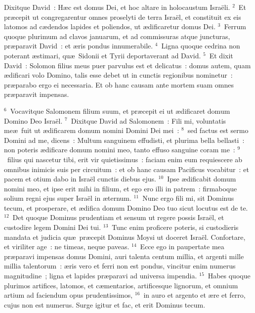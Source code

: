 \bchapter
\lettrine[lines=3,image=true,loversize=0.05,lraise=-0.03]{D}{}ixitque David~: H\ae c est domus Dei, et hoc altare in holocaustum Isra\"eli.
${}^{2}$~Et pr\ae cepit ut congregarentur omnes proselyti de terra Isra\"el, et constituit ex eis latomos ad c\ae dendos lapides et poliendos, ut \ae dificaretur domus Dei.
${}^{3}$~Ferrum quoque plurimum ad clavos januarum, et ad commissuras atque juncturas, pr\ae paravit David~: et \ae ris pondus innumerabile.
${}^{4}$~Ligna quoque cedrina non poterant \ae stimari, qu\ae\ Sidonii et Tyrii deportaverant ad David.
${}^{5}$~Et dixit David~: Solomon filius meus puer parvulus est et delicatus~: domus autem, quam \ae dificari volo Domino, talis esse debet ut in cunctis regionibus nominetur~: pr\ae parabo ergo ei necessaria. Et ob hanc causam ante mortem suam omnes pr\ae paravit impensas.


${}^{6}$~Vocavitque Salomonem filium suum, et pr\ae cepit ei ut \ae dificaret domum Domino Deo Isra\"el.
${}^{7}$~Dixitque David ad Salomonem~: Fili mi, voluntatis me\ae\ fuit ut \ae dificarem domum nomini Domini Dei mei~:
${}^{8}$~sed factus est sermo Domini ad me, dicens~: Multum sanguinem effudisti, et plurima bella bellasti~: non poteris \ae dificare domum nomini meo, tanto effuso sanguine coram me~:
${}^{9}$~filius qui nascetur tibi, erit vir quietissimus~: faciam enim eum requiescere ab omnibus inimicis suis per circuitum~: et ob hanc causam Pacificus vocabitur~: et pacem et otium dabo in Isra\"el cunctis diebus ejus.
${}^{10}$~Ipse \ae dificabit domum nomini meo, et ipse erit mihi in filium, et ego ero illi in patrem~: firmaboque solium regni ejus super Isra\"el in \ae ternum.
${}^{11}$~Nunc ergo fili mi, sit Dominus tecum, et prosperare, et \ae difica domum Domino Deo tuo sicut locutus est de te.
${}^{12}$~Det quoque Dominus prudentiam et sensum ut regere possis Isra\"el, et custodire legem Domini Dei tui.
${}^{13}$~Tunc enim proficere poteris, si custodieris mandata et judicia qu\ae\ pr\ae cepit Dominus Moysi ut doceret Isra\"el. Confortare, et viriliter age~: ne timeas, neque paveas.
${}^{14}$~Ecce ego in paupertate mea pr\ae paravi impensas domus Domini, auri talenta centum millia, et argenti mille millia talentorum~: \ae ris vero et ferri non est pondus, vincitur enim numerus magnitudine~; ligna et lapides pr\ae paravi ad universa impendia.
${}^{15}$~Habes quoque plurimos artifices, latomos, et c\ae mentarios, artificesque lignorum, et omnium artium ad faciendum opus prudentissimos,
${}^{16}$~in auro et argento et \ae re et ferro, cujus non est numerus. Surge igitur et fac, et erit Dominus tecum.


